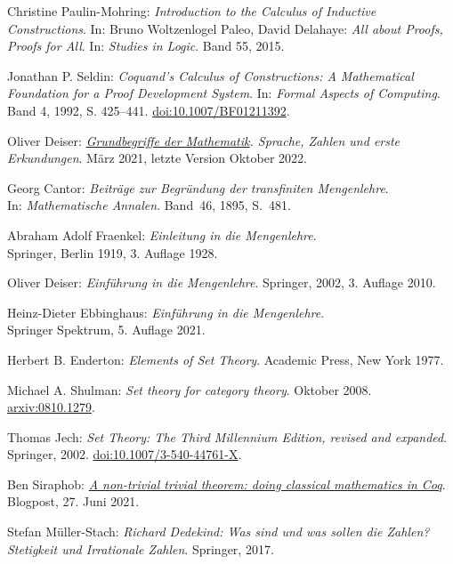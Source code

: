 \begin{thebibliography}{00}
 Christine Paulin-Mohring:
\emph{Introduction to the Calculus of Inductive Constructions}. In:
Bruno Woltzenlogel Paleo, David Delahaye: \emph{All about Proofs, Proofs for All}.
In: \emph{Studies in Logic}. Band 55, 2015.

 Jonathan P. Seldin:
\emph{Coquand's Calculus of Constructions: A Mathematical Foundation
for a Proof Development System}. In: \emph{Formal Aspects of Computing}.
Band 4, 1992, S. 425--441.
\href{https://doi.org/10.1007/BF01211392}{doi:10.1007/BF01211392}.

Oliver Deiser:
\emph{\href{https://www.aleph1.info/?call=Puc&permalink=grundbegriffe}%
{Grundbegriffe der Mathematik}. Sprache, Zahlen und erste
Erkundungen}. März 2021, letzte Version Oktober 2022.

 Georg Cantor:
\emph{Beiträge zur Begründung der transfiniten Mengenlehre}.\\
In: \emph{Mathematische Annalen}. Band~46, 1895, S.~481.

 Abraham Adolf Fraenkel:
\emph{Einleitung in die Mengenlehre}.\\
Springer, Berlin 1919, 3. Auflage 1928.

 Oliver Deiser:
\emph{Einführung in die Mengenlehre}.
Springer, 2002, 3. Auflage 2010.

 Heinz-Dieter Ebbinghaus:
\emph{Einführung in die Mengenlehre}.\\
Springer Spektrum, 5. Auflage 2021.

 Herbert B. Enderton:
\emph{Elements of Set Theory}. Academic Press, New York 1977.

 Michael A. Shulman:
\emph{Set theory for category theory}.
Oktober 2008.\\
\href{https://arxiv.org/abs/0810.1279}{arxiv:0810.1279}.

 Thomas Jech: \emph{Set Theory: The Third Millennium
Edition, revised and expanded}. Springer, 2002.
\href{https://doi.org/10.1007/3-540-44761-X}{doi:10.1007/3-540-44761-X}.

 Ben Siraphob:
\href{https://siraben.dev/2021/06/27/classical-math-coq.html}{%
\emph{A non-trivial trivial theorem: doing classical mathematics in Coq}}.
Blogpost, 27. Juni 2021.

 Stefan Müller-Stach:
\emph{Richard Dedekind: Was sind und was sollen die Zahlen?
Stetigkeit und Irrationale Zahlen}. Springer, 2017.


\end{thebibliography}
